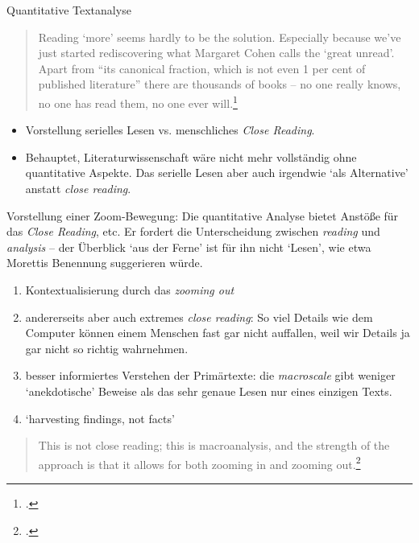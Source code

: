 \begin{frame}[allowframebreaks]{Quantitative Textanalyse}

\begin{block}{}
\begin{quote}
    Reading `more' seems hardly to be the solution. Especially because we've just started rediscovering what Margaret Cohen calls the `great unread'. \lbrack{} Apart from ``its canonical fraction, which is not even 1 per cent of published literature''\rbrack{} there are \lbrack{}thousands of books\rbrack{} -- no one really knows, no one has read them, no one ever will.\footcite[45]{distantreading} 
\end{quote}
\end{block}

\begin{itemize}\footnotesize
    \item Vorstellung serielles Lesen vs. menschliches \emph{Close Reading}. 
    \item Behauptet, Literaturwissenschaft wäre nicht mehr vollständig ohne quantitative Aspekte. Das serielle Lesen aber auch irgendwie `als Alternative' anstatt \emph{close reading}.
\end{itemize}

\framebreak

Vorstellung einer Zoom-Bewegung: Die quantitative Analyse bietet Anstöße für das \emph{Close Reading}, etc.
Er fordert die Unterscheidung zwischen \emph{reading} und \emph{analysis} -- der Überblick `aus der Ferne' ist für ihn nicht `Lesen', wie etwa Morettis Benennung suggerieren würde.

\begin{enumerate}\footnotesize
    \item Kontextualisierung durch das \emph{zooming out}
    \item andererseits aber auch extremes \emph{close reading}: So viel Details wie dem Computer können einem Menschen fast gar nicht auffallen, weil wir Details ja gar nicht so richtig wahrnehmen.
    \item besser informiertes Verstehen der Primärtexte: die \emph{macroscale} gibt weniger `anekdotische' Beweise als das sehr genaue Lesen nur eines einzigen Texts.
    \item `harvesting findings, not facts'
\end{enumerate}

\begin{block}{}
\begin{quote}
    This is not close reading; this is macroanalysis, and the strength of the approach is that it allows for both zooming in and zooming out.\footcite[23]{macroanalysis}
\end{quote}
\end{block}

\end{frame}

